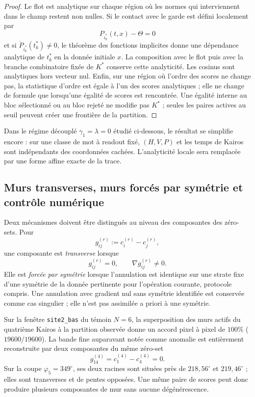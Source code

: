 \documentclass[11pt,a4paper]{article}
\theoremstyle{definition}
\theoremstyle{remark}
\begin{document}
\begin{proof}
Le flot est analytique sur chaque région où les normes qui interviennent dans le champ restent non nulles. Si le contact avec le garde est défini localement par
\[
 P_{i_k^*}(t,x)-\Theta=0
\]
et si $\dot P_{i_k^*}(t_k^*)\neq0$, le théorème des fonctions implicites donne une dépendance analytique de $t_k^*$ en la donnée initiale $x$. La composition avec le flot puis avec la branche combinatoire fixée de $K^*$ conserve cette analyticité. Les cosinus sont analytiques hors vecteur nul. Enfin, sur une région où l'ordre des scores ne change pas, la statistique d'ordre est égale à l'un des scores analytiques ; elle ne change de formule que lorsqu'une égalité de scores est rencontrée. Une égalité interne au bloc sélectionné ou au bloc rejeté ne modifie pas $K^*$ ; seules les paires actives au seuil peuvent créer une frontière de la partition.
\end{proof}

Dans le régime découplé $\gamma_1=\lambda=0$ étudié ci-dessous, le résultat se simplifie encore : sur une classe de mot à readout fixé, $(H,V,P)$ et les temps de Kairos sont indépendants des coordonnées cachées. L'analyticité locale sera remplacée par une forme affine exacte de la trace.

\subsection{Murs transverses, murs forcés par symétrie et contrôle numérique}

Deux mécanismes doivent être distingués au niveau des composantes des zéro-sets. Pour
\[
 g_{ij}^{(r)}:=c_i^{(r)}-c_j^{(r)},
\]
une composante est \emph{transverse} lorsque
\[
 g_{ij}^{(r)}=0,
 \qquad
 \nabla g_{ij}^{(r)}\neq0.
\]
Elle est \emph{forcée par symétrie} lorsque l'annulation est identique sur une strate fixe d'une symétrie de la donnée pertinente pour l'opération courante, protocole compris. Une annulation avec gradient nul sans symétrie identifiée est conservée comme cas singulier ; elle n'est pas assimilée a priori à une symétrie.

Sur la fenêtre \texttt{site2\_bas} du témoin $N=6$, la superposition des murs actifs du quatrième Kairos à la partition observée donne un accord pixel à pixel de $100\%$ ($19600/19600$). La bande fine auparavant notée comme anomalie est entièrement reconstruite par deux composantes du même zéro-set
\[
 g_{14}^{(4)}=c_1^{(4)}-c_4^{(4)}=0.
\]
Sur la coupe $\varphi_5=349^\circ$, ses deux racines sont situées près de $218{,}56^\circ$ et $219{,}46^\circ$ ; elles sont transverses et de pentes opposées. Une même paire de scores peut donc produire plusieurs composantes de mur sans aucune dégénérescence.
\end{document}
